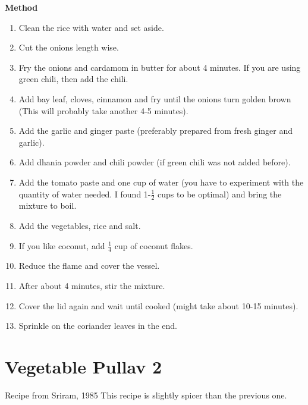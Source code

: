 {\bf Method}
\begin{enumerate}
   \item Clean the rice with water and set aside.
   \item Cut the onions length wise.
   \item Fry the onions and cardamom in butter for about 4 minutes.  If  you  are
      using  green  chili, then  add  the chili.
   \item Add bay leaf, cloves, cinnamon and fry until the onions  turn  golden
      brown (This will probably take another 4-5 minutes).
   \item Add  the  garlic  and  ginger  paste (preferably prepared from fresh
      ginger and garlic).
   \item Add dhania powder and chili powder (if green chili was  not  added
      before).
   \item Add  the  tomato  paste and one cup of water (you have to experiment
      with the quantity of water needed. I found 1-$\frac{1}{2}$ cups to be  optimal)
      and bring the mixture to boil.
   \item Add the vegetables, rice and salt.
   \item If you like coconut, add $\frac{1}{4}$ cup of coconut flakes.
  \item Reduce the flame and cover the vessel.
  \item After about 4 minutes, stir the mixture.
  \item Cover  the  lid  again  and wait until cooked (might take about 10-15
      minutes).
  \item Sprinkle on the coriander leaves in the end.
\end{enumerate}

\section{Vegetable Pullav 2}
  Recipe from Sriram, 1985
This recipe is slightly spicer than the previous one.  

